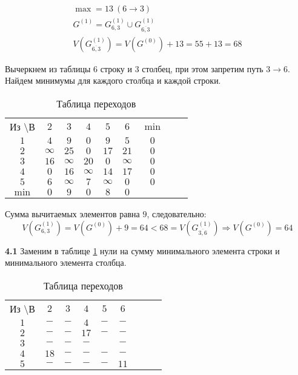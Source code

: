 \begin{gather*}
\max = 13\ (6 \rightarrow 3) \\
G^{(1)} = G_{6,3}^{(1)} \cup G_{\overline{6,3}}^{(1)} \\
V(G_{\overline{6,3}}^{(1)}) = V(G^{(0)}) + 13 = 55 + 13 = 68
\end{gather*}

Вычеркнем из таблицы $6$ строку и $3$ столбец, при этом запретим путь $3 \rightarrow 6$. Найдем минимумы для каждого столбца и каждой строки.

\begin{table}[H]
\begin{center}
	\def\tabcolsep{15pt}
	\caption{Таблица переходов}
	\label{tab:10}
	\begin{tabular}{|c||c|c|c|c|c|c|c|c|}
		\hline
		Из \textbackslash В & $2$ & $3$ & $4$ & $5$ & $6$ & $\min$ \\
		\hhline{|=#=|=|=|=|=|=|}
		$1$ & $4$ & $9$ & $0$ & $9$ & $5$ & $0$ \\
		\hline
		$2$ & $\infty$ & $25$ & $0$ & $17$ & $21$ & $0$ \\
		\hline
		$3$ & $16$ & $\infty$ & $20$ & $0$ & $\infty$ & $0$ \\ 
		\hline
		$4$ & $0$ & $16$ & $\infty$ & $14$ & $17$ & $0$ \\
		\hline
		$5$ & $6$ & $\infty$ & $7$ & $\infty$ & $0$ & $0$ \\
		\hhline{|=#=|=|=|=|=|=|}
		$\min$ & $0$ & $9$ & $0$ & $8$ & $0$ & \\ 
		\hline
	\end{tabular}
\end{center}
\end{table}

Сумма вычитаемых элементов равна $9$, следовательно:
\begin{equation*}
V(G_{6,3}^{(1)}) = V(G^{(0)}) + 9 = 64 < 68 = V(G_{\overline{3,6}}^{(1)}) \Rightarrow V(G^{(0)}) = 64
\end{equation*}

\textbf{4.1} Заменим в таблице \ref{tab:10} нули на сумму минимального элемента строки и минимального элемента столбца. 

\begin{table}[H]
\begin{center}
	\def\tabcolsep{15pt}
	\caption{Таблица переходов}
	\label{tab:11}
	\begin{tabular}{|c||c|c|c|c|c|c|c|c|}
		\hline
		Из \textbackslash В & $2$ & $3$ & $4$ & $5$ & $6$ \\
		\hhline{|=#=|=|=|=|=|=|}
		$1$ & $-$ & $-$ & $4$ & $-$ & $-$ \\
		\hline
		$2$ & $-$ & $-$ & $17$ & $-$ & $-$ \\
		\hline
		$3$ & $-$ & $-$ & $-$ & \redbold{$25$} & $-$ \\ 
		\hline
		$4$ & $18$ & $-$ & $-$ & $-$ & $-$ \\
		\hline
		$5$ & $-$ & $-$ & $-$ & $-$ & $11$ \\
		\hline
	\end{tabular}
\end{center}
\end{table}

